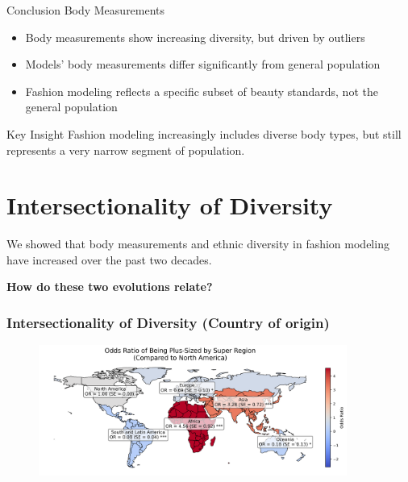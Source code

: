 \documentclass[aspectratio=169,xcolor=dvipsnames,10pt]{beamer}
\begin{document}
\begin{frame}{Conclusion Body Measurements}
    \begin{itemize}
        \setlength{\itemsep}{0.8em}
        \pause \item Body measurements show increasing diversity, but driven by outliers
        \pause \item Models' body measurements differ significantly from general population
        \pause \item Fashion modeling reflects a specific subset of beauty standards, not the general population
    \end{itemize}
    \pause
    \vspace{1em}
    \begin{block}{Key Insight}
        Fashion modeling increasingly includes diverse body types, but still represents a very narrow segment of population.
    \end{block}
    
\end{frame}
\section{Intersectionality of Diversity}


\begin{frame}
    \Large{
        \begin{center}
            We showed that body measurements and ethnic diversity in fashion modeling have increased over the past two decades.\\
                        \vspace{1em}

            \textbf{How do these two evolutions relate?}\\
        \end{center}
    }
\end{frame}


\begin{frame}[t]
    \frametitle{Intersectionality of Diversity (Country of origin)}
    \begin{figure}
            \begin{center}
            \includegraphics[width=0.9\textwidth]{figures/super_region_odds_map.png}
            \end{center}
        \end{figure}
\end{frame}
\end{document}

